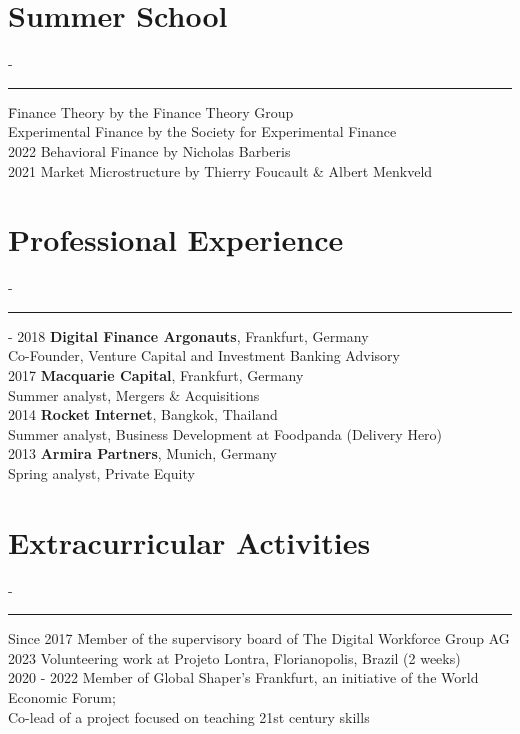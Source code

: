 \documentclass{res}
\newcommand{\sectionline}{	\vspace{-8pt}
	{\parindent-\sectionwidth \rule{\resumewidth}{0.4pt}} }
\newenvironment{nstabbing}
  {\setlength{\topsep}{-\parskip}%
   \setlength{\partopsep}{0pt}%
   \tabbing}
  {\endtabbing}
\begin{document}
\begin{resume}
\section{Summer School}
	\sectionline
	\vspace{-3ex}
	\begin{nstabbing}
		2023 \qquad \qquad \qquad \= Finance Theory by the Finance Theory Group \\
			\> Experimental Finance by the Society for Experimental Finance \\[0.5ex]
		2022 \> Behavioral Finance by Nicholas Barberis \\[0.5ex]
		2021 \> Market Microstructure by Thierry Foucault \& Albert Menkveld
	\end{nstabbing}

\section{Professional Experience}
	\sectionline
	\vspace{-3ex}
   \begin{nstabbing}
    2015 - 2018 \qquad \quad \= \textbf{Digital Finance Argonauts}, Frankfurt, Germany \\
    	\> Co-Founder, Venture Capital and Investment Banking Advisory \\[0.5ex]
	2017 \> \textbf{Macquarie Capital}, Frankfurt, Germany\\
    	\> Summer analyst, Mergers \& Acquisitions \\[0.5ex]
	2014 \> \textbf{Rocket Internet}, Bangkok, Thailand\\
    	\> Summer analyst, Business Development at Foodpanda (Delivery Hero) \\[0.5ex]
	2013 \> \textbf{Armira Partners}, Munich, Germany\\
    	\>  Spring analyst, Private Equity
    \end{nstabbing}

\section{Extracurricular Activities}
	\sectionline
	\vspace{-3ex}
    \begin{nstabbing}
		Since 2017 \qquad \quad \= Member of the supervisory board of The Digital Workforce Group AG \\[0.5ex]
		2023 \> Volunteering work at Projeto Lontra, Florianopolis, Brazil (2 weeks)\\[0.5ex]
    	2020 - 2022 \> Member of Global Shaper's Frankfurt, an initiative of the World Economic Forum; \\
			\> Co-lead of a project focused on teaching 21st century skills
	\end{nstabbing}


\end{resume}
\end{document}
